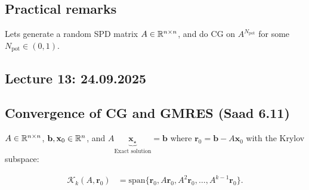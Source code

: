 \subsection{Practical remarks}
Lets generate a random SPD matrix $A \in \mathbb{R}^{n \times n}$, and do CG on $A^{N_{\text{pot}}}$ for some $N_{\text{pot}} \in (0,1)$.


\subsection{Lecture 13: 24.09.2025}

\subsection{Convergence of CG and GMRES (Saad 6.11)}
$A \in \mathbb{R}^{n \times n}$, $\mathbf{b}, \mathbf{x}_0 \in \mathbb{R}^n$, and $A \underbrace{\mathbf{x}_{\star}}_{\text{Exact solution}} = \mathbf{b}$ where $\mathbf{r}_0 = \mathbf{b} - A \mathbf{x}_0$ with the Krylov subspace:

\begin{align*}
    \mathcal{K}_k(A, \mathbf{r}_0) & = \text{span} \{\mathbf{r}_0, A \mathbf{r}_0, A^2 \mathbf{r}_0, \ldots, A^{k-1} \mathbf{r}_0\}.
\end{align*}